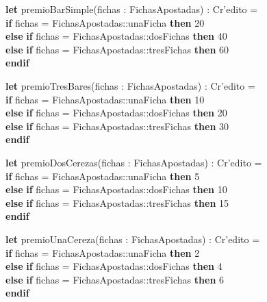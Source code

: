 \begin{itemize}
    \textbf{let} premioBarSimple(fichas : FichasApostadas) : Cr'edito =\\
        \textbf{if} fichas = FichasApostadas::unaFicha \textbf{then} 20\\
        \textbf{else} \textbf{if} fichas = FichasApostadas::dosFichas \textbf{then} 40\\
        \textbf{else} \textbf{if} fichas = FichasApostadas::tresFichas \textbf{then} 60\\
        \textbf{endif}

    \textbf{let} premioTresBares(fichas : FichasApostadas) : Cr'edito =\\
        \textbf{if} fichas = FichasApostadas::unaFicha \textbf{then} 10\\
        \textbf{else} \textbf{if} fichas = FichasApostadas::dosFichas \textbf{then} 20\\
        \textbf{else} \textbf{if} fichas = FichasApostadas::tresFichas \textbf{then} 30\\
        \textbf{endif}

    \textbf{let} premioDosCerezas(fichas : FichasApostadas) : Cr'edito =\\
        \textbf{if} fichas = FichasApostadas::unaFicha \textbf{then} 5\\
        \textbf{else} \textbf{if} fichas = FichasApostadas::dosFichas \textbf{then} 10\\
        \textbf{else} \textbf{if} fichas = FichasApostadas::tresFichas \textbf{then} 15\\
        \textbf{endif}

    \textbf{let} premioUnaCereza(fichas : FichasApostadas) : Cr'edito =\\
        \textbf{if} fichas = FichasApostadas::unaFicha \textbf{then} 2\\
        \textbf{else} \textbf{if} fichas = FichasApostadas::dosFichas \textbf{then} 4\\
        \textbf{else} \textbf{if} fichas = FichasApostadas::tresFichas \textbf{then} 6\\
        \textbf{endif}


\end{itemize}
